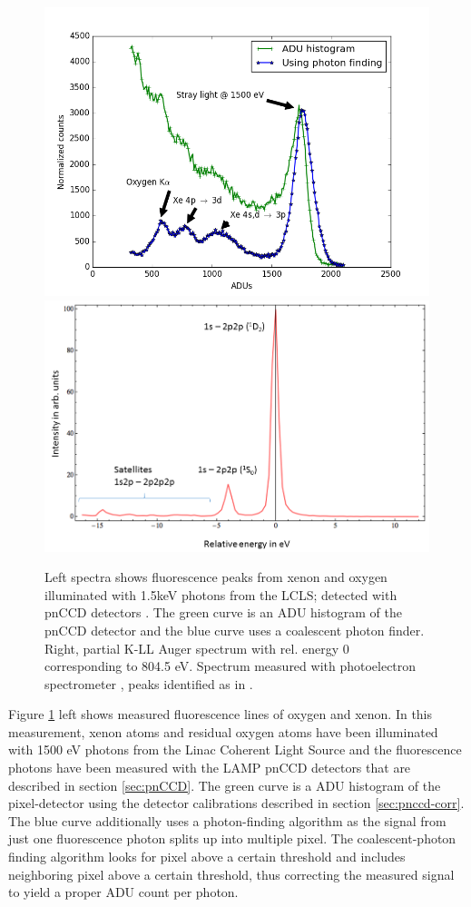 \begin{figure}
	\centering
		\includegraphics[width=.49\textwidth]{images/pnCCD-histogram.png}
		\includegraphics[width=.49\textwidth]{images/auger-spectra.png}
	\caption[Fluorescence spectra from xenon and neon K-LL Auger spectrum.]{Left spectra shows fluorescence peaks from xenon and oxygen illuminated with 1.5keV photons from the LCLS; detected with pnCCD detectors \citep{Bucher-2016-Unpublished, Rudek-2012-NatPho}. The green curve is an ADU histogram of the pnCCD detector and the blue curve uses a coalescent photon finder. Right, partial K-LL Auger spectrum with rel. energy 0 corresponding to 804.5 eV. Spectrum measured with photoelectron spectrometer \cite{Bucher-2014-Unpublished}, peaks identified as in \citep{Krause-1970-PhysLettA}.}
	\label{fig:pnCCD-histogram}
\end{figure}
Figure \ref{fig:pnCCD-histogram} left shows measured fluorescence lines of oxygen and xenon. In this measurement, xenon atoms and residual oxygen atoms have been illuminated with 1500 eV photons from the Linac Coherent Light Source and the fluorescence photons have been measured with the LAMP pnCCD detectors that are described in section \ref{sec:pnCCD}. The green curve is a ADU histogram of the pixel-detector using the detector calibrations described in section \ref{sec:pnccd-corr}. The blue curve additionally uses a photon-finding algorithm as the signal from just one fluorescence photon splits up into multiple pixel. The coalescent-photon finding algorithm looks for pixel above a certain threshold and includes neighboring pixel above a certain threshold, thus correcting the measured signal to yield a proper ADU count per photon.\\
